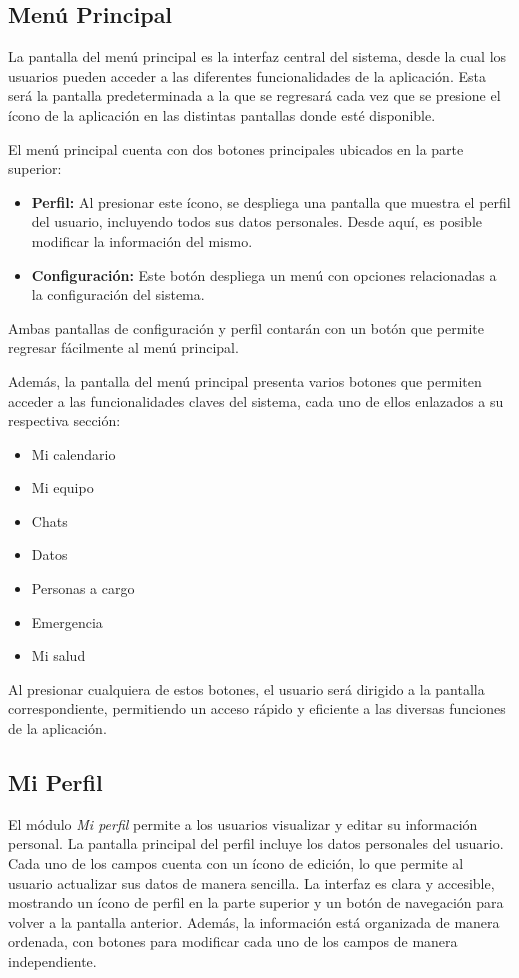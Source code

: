 \documentclass[a4paper,12pt]{article}
\begin{document}
    \subsection{Menú Principal}
    \par La pantalla del menú principal es la interfaz central del sistema, desde la cual los usuarios pueden acceder a las diferentes funcionalidades de la aplicación. Esta será la pantalla predeterminada a la que se regresará cada vez que se presione el ícono de la aplicación en las distintas pantallas donde esté disponible.
    \par El menú principal cuenta con dos botones principales ubicados en la parte superior:
    \begin{itemize}
        \item \textbf{Perfil:} Al presionar este ícono, se despliega una pantalla que muestra el perfil del usuario, incluyendo todos sus datos personales. Desde aquí, es posible modificar la información del mismo.
        \item \textbf{Configuración:} Este botón despliega un menú con opciones relacionadas a la configuración del sistema.
    \end{itemize}
    \par Ambas pantallas de configuración y perfil contarán con un botón que permite regresar fácilmente al menú principal.
    \par Además, la pantalla del menú principal presenta varios botones que permiten acceder a las funcionalidades claves del sistema, cada uno de ellos enlazados a su respectiva sección:
    \begin{itemize}
        \item Mi calendario
        \item Mi equipo
        \item Chats
        \item Datos
        \item Personas a cargo
        \item Emergencia
        \item Mi salud
    \end{itemize}
    \par Al presionar cualquiera de estos botones, el usuario será dirigido a la pantalla correspondiente, permitiendo un acceso rápido y eficiente a las diversas funciones de la aplicación.
    \subsection{Mi Perfil}
    \par El módulo \textit{Mi perfil} permite a los usuarios visualizar y editar su información personal. La pantalla principal del perfil incluye los datos personales del usuario. Cada uno de los campos cuenta con un ícono de edición, lo que permite al usuario actualizar sus datos de manera sencilla. La interfaz es clara y accesible, mostrando un ícono de perfil en la parte superior y un botón de navegación para volver a la pantalla anterior. Además, la información está organizada de manera ordenada, con botones para modificar cada uno de los campos de manera independiente.
\end{document}
